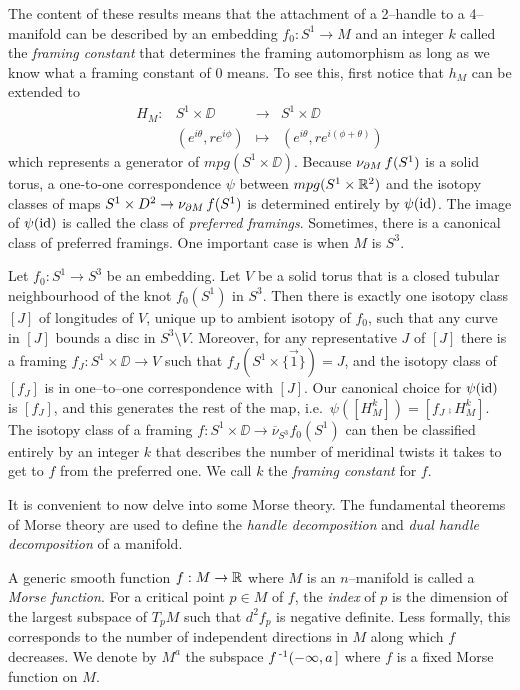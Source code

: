 \begin{rmk}
  The content of these results means that the attachment of a 2--handle to a 4--manifold can be described by an embedding $f_0:S^1\to M$ and an integer $k$ called the \emph{framing constant} that determines the framing automorphism as long as we know what a framing constant of $0$ means.
  To see this, first notice that $h_M$ can be extended to
  \[
	  \begin{array}{cccc}
		  H_M: & S^1\times\DD & \to & S^1\times\DD \\
			  & (e^{i\theta}, re^{i\phi}) & \mapsto & (e^{i\theta},re^{i(\phi+\theta)})	
	  \end{array}
  \]
  which represents a generator of $mpg(S^1\times\DD)$.
  Because $\nu_{\partial M}\,f(S^1)$ is a solid torus, a one-to-one correspondence
  $\psi$ between $mpg(S^1\times\mathbb{R}^2)$ and the isotopy classes of maps $S^1\times D^2\to\nu_{\partial M}\,f(S^1)$ is determined entirely by $\psi(\mathrm{id})$.
  The image of $\psi(\mathrm{id})$ is called the class of \emph{preferred framings}.
  Sometimes, there is a canonical class of preferred framings.
  One important case is when $M$ is $S^3$.

  Let $f_0:S^1\to S^3$ be an embedding.
  Let $V$ be a solid torus that is a closed tubular neighbourhood of the knot $f_0(S^1)$ in $S^3$.
  Then there is exactly one isotopy class $[J]$ of longitudes of $V$, unique up to ambient isotopy of $f_0$, such that any curve in $[J]$ bounds a disc in $S^3\setminus V$.
  Moreover, for any representative $J$ of $[J]$ there is a framing $f_J:S^1\times\DD\to V$ such that $f_J(S^1\times\{\vec{1}\})=J$, and the isotopy class of $[f_J]$ is in one--to--one correspondence with $[J]$.
  Our canonical choice for $\psi(\mathrm{id})$ is $[f_J]$, and this generates the rest of the map, i.e.\ $\psi([H_M^k])=[f_J\comp H_M^k]$.
  The isotopy class of a framing $f:S^1\times\DD\to\overline{\nu}_{S^3}f_0(S^1)$ can then be classified entirely by an integer $k$ that describes the number of meridinal twists it takes to get to $f$ from the preferred one.
  We call $k$ the \emph{framing constant} for $f$.
\end{rmk}

It is convenient to now delve into some Morse theory.
The fundamental theorems of Morse theory are used to define the \emph{handle decomposition} and \emph{dual handle decomposition} of a manifold.

\begin{defn}
  A generic smooth function $f:M\to\mathbb{R}$ where $M$ is an $n$--manifold is called a \emph{Morse function}.
  For a critical point $p\in M$ of $f$, the \emph{index} of $p$ is the dimension of the largest subspace of $T_p M$ such that $d^2f_p$ is negative definite.
  Less formally, this corresponds to the number of independent directions in $M$ along which $f$ decreases.
  We denote by $M^a$ the subspace $f^{\,\text{-}1}(-\infty,a\,]$ where $f$ is a fixed Morse function on $M$.
\end{defn}

